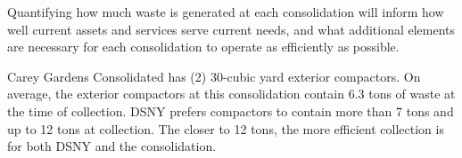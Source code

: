 
    Quantifying how much waste is generated at each consolidation will inform how well current assets and services serve current needs, and what additional elements are necessary for each consolidation to operate as efficiently as possible.
    
    Carey Gardens Consolidated has (2) 30-cubic yard exterior compactors. On average, the exterior compactors at this consolidation contain 6.3 tons of waste at the time of collection. DSNY prefers compactors to contain more than 7 tons and up to 12 tons at collection. The closer to 12 tons, the more efficient collection is for both DSNY and the consolidation.
